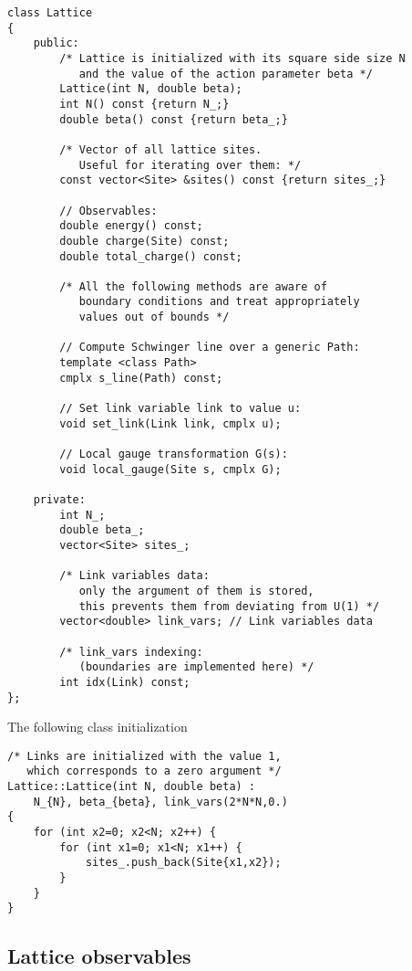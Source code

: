 \begin{lstlisting}[caption={Lattice class}]
class Lattice
{
    public:
        /* Lattice is initialized with its square side size N
           and the value of the action parameter beta */
        Lattice(int N, double beta);
        int N() const {return N_;}
        double beta() const {return beta_;}
        
        /* Vector of all lattice sites.
           Useful for iterating over them: */
        const vector<Site> &sites() const {return sites_;}
        
        // Observables: 
        double energy() const;
        double charge(Site) const;
        double total_charge() const;
        
        /* All the following methods are aware of
           boundary conditions and treat appropriately
           values out of bounds */
        
        // Compute Schwinger line over a generic Path:
        template <class Path>
        cmplx s_line(Path) const;
        
        // Set link variable link to value u:
        void set_link(Link link, cmplx u);
        
        // Local gauge transformation G(s):
        void local_gauge(Site s, cmplx G);
        
    private:
        int N_;
        double beta_;
        vector<Site> sites_;

        /* Link variables data:
           only the argument of them is stored,
           this prevents them from deviating from U(1) */
        vector<double> link_vars; // Link variables data
        
        /* link_vars indexing:
           (boundaries are implemented here) */
        int idx(Link) const;
};
\end{lstlisting}

The following class initialization 

\begin{lstlisting}[caption={Lattice constructor}]
/* Links are initialized with the value 1,
   which corresponds to a zero argument */
Lattice::Lattice(int N, double beta) :
    N_{N}, beta_{beta}, link_vars(2*N*N,0.)
{
    for (int x2=0; x2<N; x2++) {
        for (int x1=0; x1<N; x1++) {
            sites_.push_back(Site{x1,x2});
        }
    }
}
\end{lstlisting}

\subsection*{Lattice observables}

